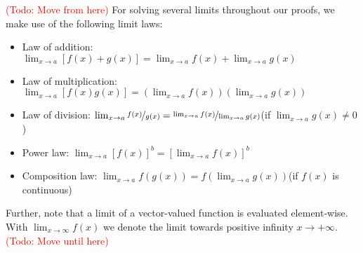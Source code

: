 \documentclass{article} %
\newcommand{\todo}[1]{\textcolor{red}{(Todo: #1)}}
\begin{document}
\todo{Move from here}
For solving several limits throughout our proofs, we make use of the following limit laws:
\begin{itemize}
    \item Law of addition: \(\lim_{x \to a} \left[f(x) + g(x)\right] = \lim_{x \to a}f(x) + \lim_{x \to a}g(x)\)
    \item Law of multiplication: \(\lim_{x \to a} \left[f(x) g(x)\right] = \left(\lim_{x \to a}f(x)\right) \left(\lim_{x \to a}g(x)\right)\)
    \item Law of division: \(\lim_{x \to a} \nicefrac{f(x)}{g(x)} =  \nicefrac{\lim_{x \to a}f(x)}{\lim_{x \to a}g(x)}\)\quad(if \(\lim_{x \to a}g(x) \ne 0\))
    \item Power law: \(\lim_{x \to a} \left[f(x)\right]^b = \left[\lim_{x \to a} f(x)\right]^b\)
    \item Composition law: \(\lim_{x \to a} f(g(x)) = f(\lim_{x \to a}g(x))\)\quad(if \(f(x)\) is continuous)
\end{itemize}
Further, note that a limit of a vector-valued function is evaluated element-wise. With \(\lim_{x \to \infty} f(x)\) we denote the limit towards positive infinity \(x \to +\infty\).
\todo{Move until here}
\end{document}
